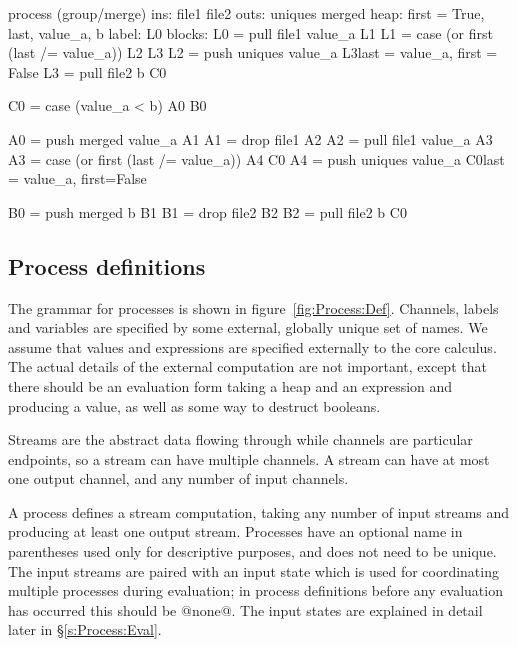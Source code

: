 \begin{code}
process (group/merge)
     ins: file1 file2
    outs: uniques merged
    heap: {first = True, last, value_a, b}
   label: L0
  blocks: L0 = pull file1   value_a               L1
          L1 = case (or first (last /= value_a))  L2    L3
          L2 = push uniques value_a               L3{last = value_a, first = False}
          L3 = pull file2 b                       C0

          C0 = case (value_a < b)                 A0    B0

          A0 = push merged  value_a               A1
          A1 = drop file1                         A2
          A2 = pull file1   value_a               A3
          A3 = case (or first (last /= value_a))  A4    C0
          A4 = push uniques value_a               C0{last = value_a, first=False}

          B0 = push merged b                      B1
          B1 = drop file2                         B2
          B2 = pull file2  b                      C0
\end{code}


\subsection{Process definitions}


The grammar for processes is shown in figure~\ref{fig:Process:Def}.
Channels, labels and variables are specified by some external, globally unique set of names.
We assume that values and expressions are specified externally to the core calculus.
The actual details of the external computation are not important, except that there should be an evaluation form taking a heap and an expression and producing a value, as well as some way to destruct booleans.

Streams are the abstract data flowing through while channels are particular endpoints, so a stream can have multiple channels.
A stream can have at most one output channel, and any number of input channels.

A process defines a stream computation, taking any number of input streams and producing at least one output stream.
Processes have an optional name in parentheses used only for descriptive purposes, and does not need to be unique.
The input streams are paired with an input state which is used for coordinating multiple processes during evaluation; in process definitions before any evaluation has occurred this should be @none@.
The input states are explained in detail later in \S\ref{s:Process:Eval}.

